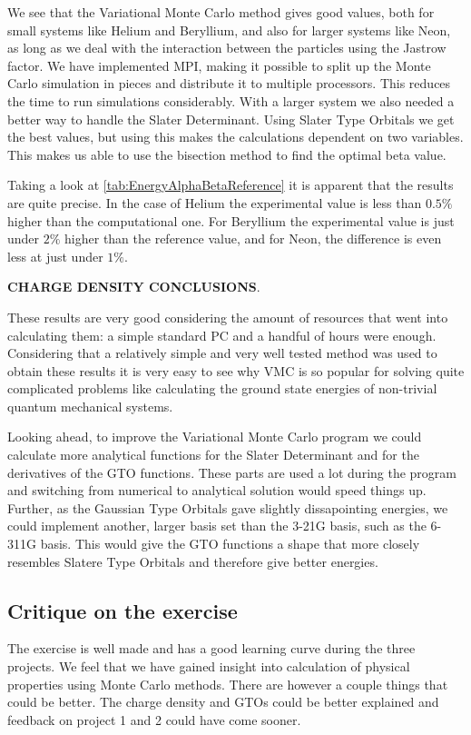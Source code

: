 We see that the Variational Monte Carlo method gives good values, both for small systems like Helium and Beryllium, and also for larger systems like Neon, as long as we deal with the interaction between the particles using the Jastrow factor. We have implemented MPI, making it possible to split up the Monte Carlo simulation in pieces and distribute it to multiple processors. This reduces the time to run simulations considerably. With a larger system we also needed a better way to handle the Slater Determinant. Using Slater Type Orbitals we get the best values, but using this makes the calculations dependent on two variables. This makes us able to use the bisection method to find the optimal beta value. 

Taking a look at \ref{tab:EnergyAlphaBetaReference} it is apparent that the results are quite precise. In the case of Helium the experimental value is less than $0.5\%$ higher than the computational one. For Beryllium the experimental value is just under $2\%$ higher than the reference value, and for Neon, the difference is even less at just under $1\%$. 

\textbf{CHARGE DENSITY CONCLUSIONS}. 

These results are very good considering the amount of resources that went into calculating them: a simple standard PC and a handful of hours were enough. Considering that a relatively simple and very well tested method was used to obtain these results it is very easy to see why VMC is so popular for solving quite complicated problems like calculating the ground state energies of non-trivial quantum mechanical systems.

Looking ahead, to improve the Variational Monte Carlo program we could calculate more analytical functions for the Slater Determinant and for the derivatives of the GTO functions. These parts are used a lot during the program and switching from numerical to analytical solution would speed things up. Further, as the Gaussian Type Orbitals gave slightly dissapointing energies, we could implement another, larger basis set than the 3-21G basis, such as the 6-311G basis. This would give the GTO functions a shape that more closely resembles Slatere Type Orbitals and therefore give better energies.  

\subsection{Critique on the exercise}
	The exercise is well made and has a good learning curve during the three projects. We feel that we have gained insight into calculation of physical properties using Monte Carlo methods. There are however a couple things that could be better. The charge density and GTOs could be better explained and feedback on project 1 and 2 could have come sooner. 